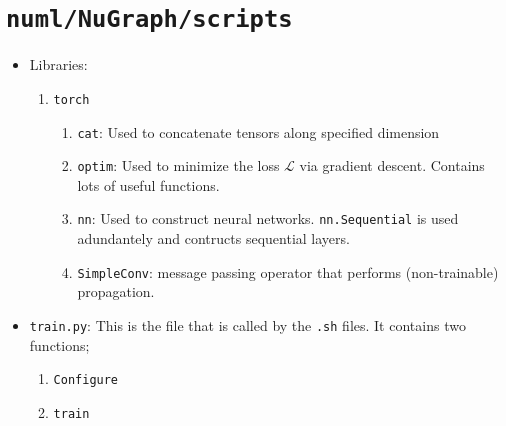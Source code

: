 \section{\texttt{numl/NuGraph/scripts}}


    
\begin{itemize}
    \item Libraries:
        \begin{enumerate}
            \item \texttt{torch}
                \begin{enumerate}
                    \item \texttt{cat}: Used to concatenate tensors along specified dimension
                    \item \texttt{optim}: Used to minimize the loss $\mathcal{L}$ via gradient descent. Contains lots of useful functions.
                    \item \texttt{nn}: Used to construct neural networks. \texttt{nn.Sequential} is used adundantely and contructs sequential layers.

                    \item \texttt{SimpleConv}: message passing operator that performs (non-trainable) propagation.
                \end{enumerate}
        \end{enumerate}


    \item \texttt{train.py}: This is the file that is called by the \texttt{.sh} files. It contains two functions;
        \begin{enumerate}
            \item \texttt{Configure}

            \item \texttt{train}
        \end{enumerate}


\end{itemize}
